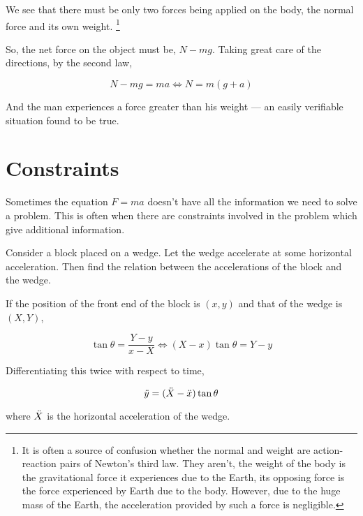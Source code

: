 We see that there must be only two forces being applied on the body,
the normal force and its own weight. \footnote{It is often a source of 
confusion whether the normal and weight are action-reaction pairs of Newton's third law.
They aren't, the weight of the body is the gravitational force it experiences 
due to the Earth, its opposing force is the force experienced by Earth due to the body.
However, due to the huge mass of the Earth, the acceleration provided by such a force is 
negligible.}

So, the net force on the object must be, \(N - mg\). Taking great care of the directions, 
by the second law,

\begin{equation*}
    N - mg = ma \iff N = m(g + a)
\end{equation*}

And the man experiences a force greater than his weight --- an easily verifiable situation found 
to be true.

\section{Constraints}

Sometimes the equation \(F = ma\) doesn't have all the information we need to solve a 
problem. This is often when there are constraints involved in the problem which give 
additional information.

\begin{example}
Consider a block placed on a wedge. Let the wedge accelerate 
at some horizontal acceleration. Then find the relation between the accelerations 
of the block and the wedge.
\end{example}

\begin{soln}
    If the position of the front end of the block is 
    \((x,y)\) and that of the wedge is \((X, Y)\), 

    \begin{equation*}
        \tan\theta = \frac{Y-y}{x - X} \iff (X - x)\tan\theta = Y - y
    \end{equation*}

    Differentiating this twice with respect to time, 

    \begin{equation}
        \ddot{y} = (\ddot{X} - \ddot{x}) \tan\theta
    \end{equation}

    where \(\ddot{X}\) is the horizontal acceleration of the wedge.
\end{soln}

